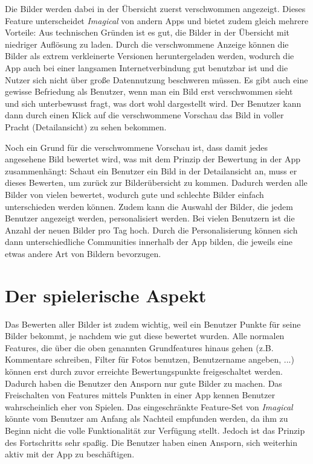 Die Bilder werden dabei in der Übersicht zuerst verschwommen angezeigt.
Dieses Feature unterscheidet \textit{Imagical} von andern Apps und bietet zudem gleich mehrere Vorteile: Aus technischen Gründen ist es gut, die Bilder in der Übersicht mit niedriger Auflösung zu laden. Durch die verschwommene Anzeige können die Bilder als extrem verkleinerte Versionen heruntergeladen werden, wodurch die App auch bei einer langsamen Internetverbindung gut benutzbar ist und die Nutzer sich nicht über große Datennutzung beschweren müssen. Es gibt auch eine gewisse Befriedung als Benutzer, wenn man ein Bild erst verschwommen sieht und sich unterbewusst fragt, was dort wohl dargestellt wird. Der Benutzer kann dann durch einen Klick auf die verschwommene Vorschau das Bild in voller Pracht (Detailansicht) zu sehen bekommen.

Noch ein Grund für die verschwommene Vorschau ist, dass damit jedes angesehene Bild bewertet wird, was mit dem Prinzip der Bewertung in der App zusammenhängt:
Schaut ein Benutzer ein Bild in der Detailansicht an, muss er dieses Bewerten, um zurück zur Bilderübersicht zu kommen. Dadurch werden alle Bilder von vielen bewertet, wodurch gute und schlechte Bilder einfach unterschieden werden können. Zudem kann die Auswahl der Bilder, die jedem Benutzer angezeigt werden, personalisiert werden. Bei vielen Benutzern ist die Anzahl der neuen Bilder pro Tag hoch. Durch die Personalisierung können sich dann unterschiedliche Communities innerhalb der App bilden, die jeweils eine etwas andere Art von Bildern bevorzugen.

\section{Der spielerische Aspekt}

Das Bewerten aller Bilder ist zudem wichtig, weil ein Benutzer Punkte für seine Bilder bekommt, je nachdem wie gut diese bewertet wurden. Alle normalen Features, die über die oben genannten Grundfeatures hinaus gehen (z.B. Kommentare schreiben, Filter für Fotos benutzen, Benutzername angeben, ...) können erst durch zuvor erreichte Bewertungspunkte freigeschaltet werden. Dadurch haben die Benutzer den Ansporn nur gute Bilder zu machen.
Das Freischalten von Features mittels Punkten in einer App kennen Benutzer wahrscheinlich eher von Spielen.
Das eingeschränkte Feature-Set von \textit{Imagical} könnte vom Benutzer am Anfang als Nachteil empfunden werden, da ihm zu Beginn nicht die volle Funktionalität zur Verfügung stellt.
Jedoch ist das Prinzip des Fortschritts sehr spaßig. Die Benutzer haben einen Ansporn, sich weiterhin aktiv mit der App zu beschäftigen.

